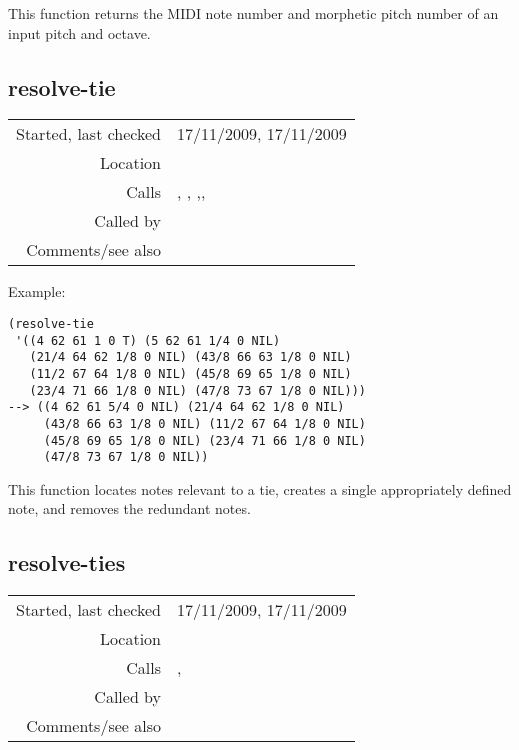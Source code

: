 \noindent This function returns the MIDI note number
and morphetic pitch number of an input pitch and
octave.


\subsection*{resolve-tie}\label{fun:resolve-tie}

\vspace{0.3cm}
\begin{tabular}{r|p{8cm}}
Started, last checked & 17/11/2009, 17/11/2009 \\
Location & \nameref{sec:director-musices} \\
Calls & \nameref{fun:firstn}, \nameref{fun:index-of-1st-tie}, \nameref{fun:indices-of-ties},\newline \nameref{fun:my-last}, \nameref{fun:remove-nth-list} \\
Called by & \nameref{fun:resolve-ties} \\
Comments/see also & \nameref{fun:resolve-ties-kern}
\end{tabular}

\vspace{0.5cm}
\noindent Example:
\begin{verbatim}
(resolve-tie
 '((4 62 61 1 0 T) (5 62 61 1/4 0 NIL)
   (21/4 64 62 1/8 0 NIL) (43/8 66 63 1/8 0 NIL)
   (11/2 67 64 1/8 0 NIL) (45/8 69 65 1/8 0 NIL)
   (23/4 71 66 1/8 0 NIL) (47/8 73 67 1/8 0 NIL)))
--> ((4 62 61 5/4 0 NIL) (21/4 64 62 1/8 0 NIL)
     (43/8 66 63 1/8 0 NIL) (11/2 67 64 1/8 0 NIL)
     (45/8 69 65 1/8 0 NIL) (23/4 71 66 1/8 0 NIL)
     (47/8 73 67 1/8 0 NIL))
\end{verbatim}

\noindent This function locates notes relevant to a
tie, creates a single appropriately defined note, and
removes the redundant notes.


\subsection*{resolve-ties}\label{fun:resolve-ties}

\vspace{0.3cm}
\begin{tabular}{r|p{8cm}}
Started, last checked & 17/11/2009, 17/11/2009 \\
Location & \nameref{sec:director-musices} \\
Calls & \nameref{fun:orthogonal-projection-unique-equalp}, \nameref{fun:resolve-tie} \\
Called by & \nameref{fun:resolve-ties} \\
Comments/see also &
\end{tabular}

